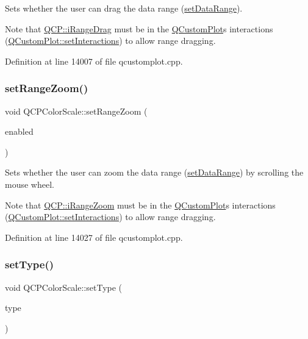 Sets whether the user can drag the data range (\hyperlink{class_q_c_p_color_scale_abe88633003a26d1e756aa74984587fef}{set\+Data\+Range}).

Note that \hyperlink{namespace_q_c_p_a2ad6bb6281c7c2d593d4277b44c2b037a2c4432b9aceafb94000be8d1b589ef18}{Q\+C\+P\+::i\+Range\+Drag} must be in the \hyperlink{class_q_custom_plot}{Q\+Custom\+Plot}\textquotesingle{}s interactions (\hyperlink{class_q_custom_plot_a5ee1e2f6ae27419deca53e75907c27e5}{Q\+Custom\+Plot\+::set\+Interactions}) to allow range dragging. 

Definition at line 14007 of file qcustomplot.\+cpp.

\mbox{\label{class_q_c_p_color_scale_a96bd60fb6317ad6821841b539c93eeeb}} 
\subsubsection{\texorpdfstring{set\+Range\+Zoom()}{setRangeZoom()}}
{\footnotesize\ttfamily void Q\+C\+P\+Color\+Scale\+::set\+Range\+Zoom (\begin{DoxyParamCaption}\item[{bool}]{enabled }\end{DoxyParamCaption})}

Sets whether the user can zoom the data range (\hyperlink{class_q_c_p_color_scale_abe88633003a26d1e756aa74984587fef}{set\+Data\+Range}) by scrolling the mouse wheel.

Note that \hyperlink{namespace_q_c_p_a2ad6bb6281c7c2d593d4277b44c2b037abee1e94353525a636aeaf0ba32b72e14}{Q\+C\+P\+::i\+Range\+Zoom} must be in the \hyperlink{class_q_custom_plot}{Q\+Custom\+Plot}\textquotesingle{}s interactions (\hyperlink{class_q_custom_plot_a5ee1e2f6ae27419deca53e75907c27e5}{Q\+Custom\+Plot\+::set\+Interactions}) to allow range dragging. 

Definition at line 14027 of file qcustomplot.\+cpp.

\mbox{\label{class_q_c_p_color_scale_a1bf9bdb291927c422dd66b404b206f1f}} 
\subsubsection{\texorpdfstring{set\+Type()}{setType()}}
{\footnotesize\ttfamily void Q\+C\+P\+Color\+Scale\+::set\+Type (\begin{DoxyParamCaption}\item[{\hyperlink{class_q_c_p_axis_ae2bcc1728b382f10f064612b368bc18a}{Q\+C\+P\+Axis\+::\+Axis\+Type}}]{type }\end{DoxyParamCaption})}

